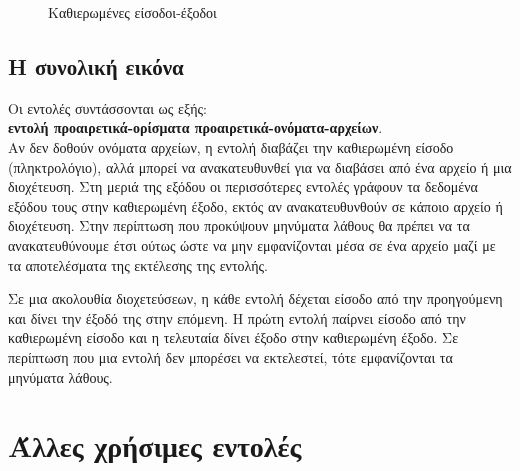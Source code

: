 \begin{figure}
	\centering
	\caption{Καθιερωμένες είσοδοι-έξοδοι}
\end{figure} 

\subsection*{Η συνολική εικόνα} 
Οι εντολές συντάσσονται ως εξής: \\
\textbf{εντολή προαιρετικά-ορίσματα προαιρετικά-ονόματα-αρχείων}.\\
Αν δεν δοθούν ονόματα αρχείων, η εντολή διαβάζει την καθιερωμένη είσοδο (πληκτρολόγιο), αλλά μπορεί να ανακατευθυνθεί για να διαβάσει από
ένα αρχείο ή μια διοχέτευση. Στη μεριά της εξόδου οι περισσότερες εντολές γράφουν τα δεδομένα εξόδου τους στην καθιερωμένη έξοδο, εκτός αν
ανακατευθυνθούν σε κάποιο αρχείο ή διοχέτευση. Στην περίπτωση που προκύψουν μηνύματα λάθους θα πρέπει να τα ανακατευθύνουμε έτσι ούτως ώστε
να μην εμφανίζονται μέσα σε ένα αρχείο μαζί με τα αποτελέσματα της εκτέλεσης της εντολής. 

Σε μια ακολουθία διοχετεύσεων, η κάθε εντολή δέχεται είσοδο από την προηγούμενη και δίνει την έξοδό της στην επόμενη. Η πρώτη εντολή παίρνει
είσοδο από την καθιερωμένη είσοδο και η τελευταία δίνει έξοδο στην καθιερωμένη έξοδο. Σε περίπτωση που μια εντολή δεν μπορέσει να
εκτελεστεί, τότε εμφανίζονται τα μηνύματα λάθους.


\section{Άλλες χρήσιμες εντολές}

